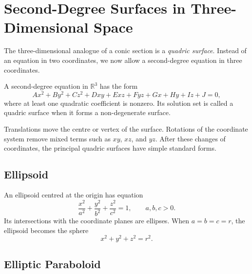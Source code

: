 \section{Second-Degree Surfaces in Three-Dimensional Space}

The three-dimensional analogue of a conic section is a \emph{quadric surface}.
Instead of an equation in two coordinates, we now allow a second-degree equation
in three coordinates.

\begin{definitionbox}
A second-degree equation in $\mathbb{R}^3$ has the form
\[
Ax^2+By^2+Cz^2+Dxy+Exz+Fyz+Gx+Hy+Iz+J=0,
\]
where at least one quadratic coefficient is nonzero. Its solution set is called
a quadric surface when it forms a non-degenerate surface.
\end{definitionbox}

Translations move the centre or vertex of the surface. Rotations of the
coordinate system remove mixed terms such as $xy$, $xz$, and $yz$. After these
changes of coordinates, the principal quadric surfaces have simple standard
forms.

\subsection{Ellipsoid}

An ellipsoid centred at the origin has equation
\[
\frac{x^2}{a^2}+\frac{y^2}{b^2}+\frac{z^2}{c^2}=1,
\qquad a,b,c>0.
\]
Its intersections with the coordinate planes are ellipses. When
$a=b=c=r$, the ellipsoid becomes the sphere
\[
x^2+y^2+z^2=r^2.
\]

\begin{center}
\end{center}

\subsection{Elliptic Paraboloid}


